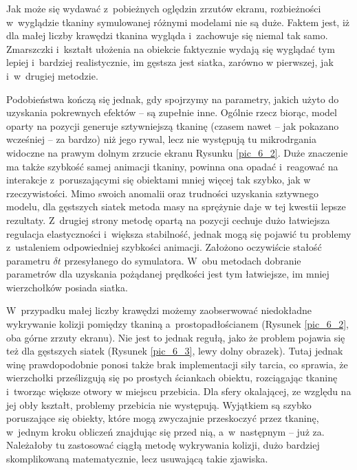 			
		
		\pagebreak
		
		
		Jak może się wydawać z~pobieżnych oględzin zrzutów ekranu, rozbieżności w~wyglądzie tkaniny symulowanej różnymi modelami nie są duże. Faktem jest, iż dla małej liczby krawędzi tkanina wygląda i~zachowuje się niemal tak samo. Zmarszczki i~kształt ułożenia na obiekcie faktycznie wydają się wyglądać tym lepiej i~bardziej realistycznie, im gęstsza jest siatka, zarówno w pierwszej, jak i~w~drugiej metodzie. 
		
		Podobieństwa kończą się jednak, gdy spojrzymy na parametry, jakich użyto do uzyskania pokrewnych efektów -- są zupełnie inne. Ogólnie rzecz biorąc, model oparty na pozycji generuje sztywniejszą tkaninę (czasem nawet -- jak pokazano wcześniej -- za bardzo) niż jego rywal, lecz nie występują tu mikrodrgania widoczne na prawym dolnym zrzucie ekranu Rysunku \ref{pic_6_2}. Duże znaczenie ma także szybkość samej animacji tkaniny, powinna ona opadać i~reagować na interakcje z~poruszającymi się obiektami mniej więcej tak szybko, jak w rzeczywistości. Mimo swoich anomalii oraz trudności uzyskania sztywnego modelu, dla gęstszych siatek metoda masy na sprężynie daje w tej kwestii lepsze rezultaty. Z~drugiej strony metodę opartą na pozycji cechuje dużo łatwiejsza regulacja elastyczności i~większa stabilność, jednak mogą się pojawić tu problemy z~ustaleniem odpowiedniej szybkości animacji. Założono oczywiście stałość parametru \(\delta t \) przesyłanego do symulatora. W~obu metodach dobranie parametrów dla uzyskania pożądanej prędkości jest tym łatwiejsze, im mniej wierzchołków posiada siatka.
		
		W~przypadku małej liczby krawędzi możemy zaobserwować niedokładne wykrywanie kolizji pomiędzy tkaniną a~prostopadłościanem (Rysunek \ref{pic_6_2}, oba górne zrzuty ekranu). Nie jest to jednak regułą, jako że problem pojawia się też dla gęstszych siatek (Rysunek \ref{pic_6_3}, lewy dolny obrazek). Tutaj jednak winę prawdopodobnie ponosi także brak implementacji siły tarcia, co sprawia, że wierzchołki prześlizgują się po prostych ściankach obiektu, rozciągając tkaninę i~tworząc większe otwory w miejscu przebicia. Dla sfery okalającej, ze względu na jej obły kształt, problemy przebicia nie występują. Wyjątkiem są szybko poruszające się obiekty, które mogą zwyczajnie przeskoczyć przez tkaninę, w~jednym kroku obliczeń znajdując się przed nią, a~w~następnym -- już za. Należałoby tu zastosować ciągłą metodę wykrywania kolizji, dużo bardziej skomplikowaną matematycznie, lecz usuwającą takie zjawiska.
		
